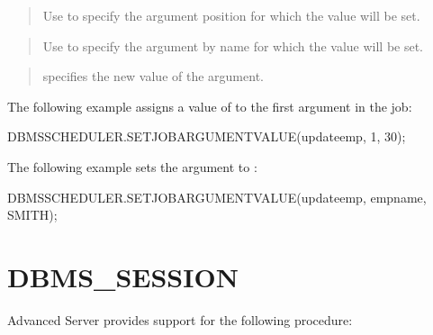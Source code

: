 \documentclass[letterpaper,10pt,english,openany,oneside]{sphinxmanual}
\begin{document}
\begin{quote}

Use  to specify the argument position for which
the value will be set.
\end{quote}

\begin{quote}

Use  to specify the argument by name for which the
value will be set.
\end{quote}

\begin{quote}

 specifies the new value of the argument.
\end{quote}


The following example assigns a value of  to the first argument in the
 job:

%
\begin{sphinxVerbatim}[commandchars=\\\{\}]
DBMS\PYGZus{}SCHEDULER.SET\PYGZus{}JOB\PYGZus{}ARGUMENT\PYGZus{}VALUE(\PYGZsq{}update\PYGZus{}emp\PYGZsq{}, 1, \PYGZsq{}30\PYGZsq{});
\end{sphinxVerbatim}

The following example sets the  argument to :

%
\begin{sphinxVerbatim}[commandchars=\\\{\}]
DBMS\PYGZus{}SCHEDULER.SET\PYGZus{}JOB\PYGZus{}ARGUMENT\PYGZus{}VALUE(\PYGZsq{}update\PYGZus{}emp\PYGZsq{}, \PYGZsq{}emp\PYGZus{}name\PYGZsq{},
\PYGZsq{}SMITH\PYGZsq{});
\end{sphinxVerbatim}

\newpage


\section{DBMS\_SESSION}
\label{\detokenize{dbms_session:dbms-session}}\label{\detokenize{dbms_session::doc}}
Advanced Server provides support for the following
 procedure:
\end{document}

